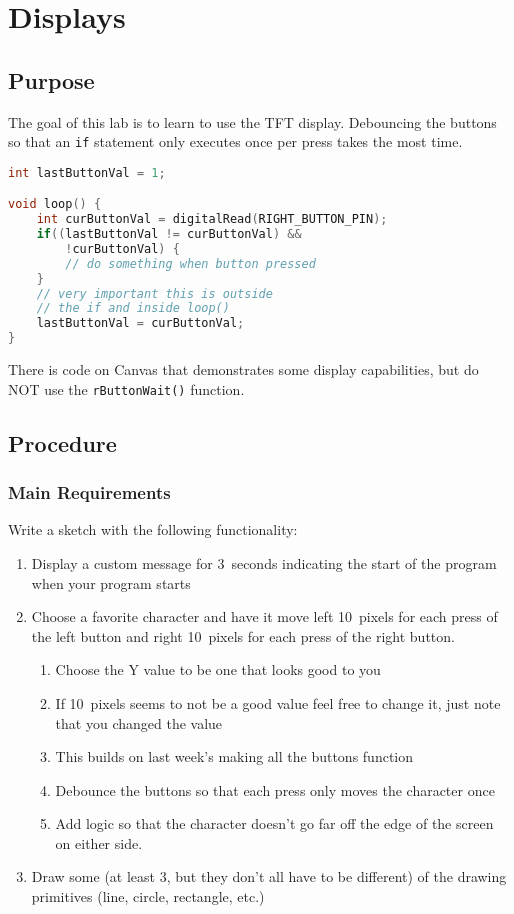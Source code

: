 \chapter{Displays}

\section{Purpose}
The goal of this lab is to learn to use the TFT display. Debouncing the buttons 
so that an \lstinline|if| statement only executes once per press takes the most time.

\begin{lstlisting}[language=C++, caption={This is example code for debouncing a button.},label={lst:debounceEx}]
int lastButtonVal = 1;

void loop() {
    int curButtonVal = digitalRead(RIGHT_BUTTON_PIN);
    if((lastButtonVal != curButtonVal) && 
        !curButtonVal) {
        // do something when button pressed
    }
    // very important this is outside 
    // the if and inside loop()
    lastButtonVal = curButtonVal; 
}
\end{lstlisting}

There is code on Canvas that demonstrates some display capabilities, but do NOT use the
\lstinline|rButtonWait()| function.

\section{Procedure}
\subsection{Main Requirements}
Write a sketch with the following functionality:
\begin{enumerate}
    \item Display a custom message for 3~seconds indicating the start of the program when
            your program starts 
    \item Choose a favorite character and have it move left 10~pixels for each press
            of the left button and right 10~pixels for each press of the right button.
    \begin{enumerate}
        \item Choose the Y value to be one that looks good to you
        \item If 10~pixels seems to not be a good value feel free to change it, just note
                that you changed the value
        \item This builds on last week's making all the buttons function
        \item Debounce the buttons so that each press only moves the character once
        \item Add logic so that the character doesn't go far off the edge of the screen
                on either side.
    \end{enumerate}
    \item Draw some (at least 3, but they don't all have to be different) of the 
            drawing primitives (line, circle, rectangle, etc.)
\end{enumerate}

